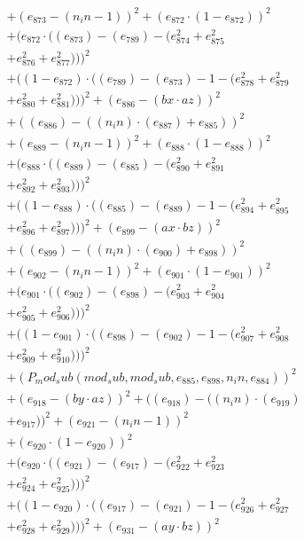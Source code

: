 \documentclass[10pt, a4paper]{article}
\begin{document}
\begin{small}
\begin{align*}
& + (e_{873} - (n_in - 1))^{2} + (e_{872}  \cdot  (1 - e_{872}))^{2} \\
& + (e_{872}  \cdot  ((e_{873}) - (e_{789}) - (e_{874}^{2} + e_{875}^{2} \\
& + e_{876}^{2} + e_{877}^{2})))^{2} \\
& + ((1 - e_{872})  \cdot  ((e_{789}) - (e_{873}) - 1 - (e_{878}^{2} + e_{879}^{2} \\
& + e_{880}^{2} + e_{881}^{2})))^{2} + (e_{886} - (bx  \cdot  az))^{2} \\
& + ((e_{886}) - ((n_in)  \cdot  (e_{887}) + e_{885}))^{2} \\
& + (e_{889} - (n_in - 1))^{2} + (e_{888}  \cdot  (1 - e_{888}))^{2} \\
& + (e_{888}  \cdot  ((e_{889}) - (e_{885}) - (e_{890}^{2} + e_{891}^{2} \\
& + e_{892}^{2} + e_{893}^{2})))^{2} \\
& + ((1 - e_{888})  \cdot  ((e_{885}) - (e_{889}) - 1 - (e_{894}^{2} + e_{895}^{2} \\
& + e_{896}^{2} + e_{897}^{2})))^{2} + (e_{899} - (ax  \cdot  bz))^{2} \\
& + ((e_{899}) - ((n_in)  \cdot  (e_{900}) + e_{898}))^{2} \\
& + (e_{902} - (n_in - 1))^{2} + (e_{901}  \cdot  (1 - e_{901}))^{2} \\
& + (e_{901}  \cdot  ((e_{902}) - (e_{898}) - (e_{903}^{2} + e_{904}^{2} \\
& + e_{905}^{2} + e_{906}^{2})))^{2} \\
& + ((1 - e_{901})  \cdot  ((e_{898}) - (e_{902}) - 1 - (e_{907}^{2} + e_{908}^{2} \\
& + e_{909}^{2} + e_{910}^{2})))^{2} \\
& + (P_mod_sub(mod_sub, mod_sub, e_{885}, e_{898}, n_in, e_{884}))^{2} \\
& + (e_{918} - (by  \cdot  az))^{2} + ((e_{918}) - ((n_in)  \cdot  (e_{919}) \\
& + e_{917}))^{2} + (e_{921} - (n_in - 1))^{2} \\
& + (e_{920}  \cdot  (1 - e_{920}))^{2} \\
& + (e_{920}  \cdot  ((e_{921}) - (e_{917}) - (e_{922}^{2} + e_{923}^{2} \\
& + e_{924}^{2} + e_{925}^{2})))^{2} \\
& + ((1 - e_{920})  \cdot  ((e_{917}) - (e_{921}) - 1 - (e_{926}^{2} + e_{927}^{2} \\
& + e_{928}^{2} + e_{929}^{2})))^{2} + (e_{931} - (ay  \cdot  bz))^{2} \\

\end{align*}
\end{small}
\end{document}
